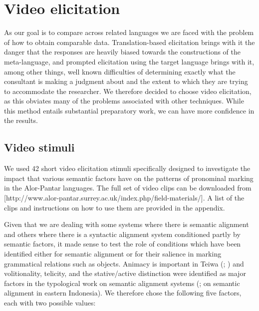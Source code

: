 \section{Video elicitation}
\label{sec:10:4}
As our goal is to compare across related languages we are faced with the problem of how to obtain comparable data. Translation-based elicitation brings with it the danger that the responses are heavily biased towards the constructions of the meta-language, and prompted elicitation using the target language brings with it, among other things, well known difficulties of determining exactly what the consultant is making a judgment about and the extent to which they are trying to accommodate the researcher. We therefore decided to choose video elicitation, as this obviates many of the problems associated with other techniques. While this method entails substantial preparatory work, we can have more confidence in the results.

\subsection{Video stimuli}
\label{sec:10:4.1}
We used 42 short video elicitation stimuli specifically designed to investigate the impact that various semantic factors have on the patterns of pronominal marking in the Alor-Pantar languages. The full set of video clips can be downloaded from [http://www.alor-pantar.surrey.ac.uk/index.php/field-materials/]. A list of the clips and instructions on how to use them are provided in the appendix.

  Given that we are dealing with some systems where there is semantic alignment and others where there is a syntactic alignment system conditioned partly by semantic factors, it made sense to test the role of conditions which have been identified either for semantic alignment or for their salience in marking grammatical relations such as objects. Animacy is important in Teiwa (\citealt[171]{Klamer2010grammar}; \citealt{KlamerEtAl2006}) and volitionality, telicity, and the stative/active distinction were identified as major factors in the typological work on semantic alignment systems (\citealt{Arkadiev2008}; \citealt{Klamer2008} on semantic alignment in eastern Indonesia). We therefore chose the following five factors, each with two possible values:
  
